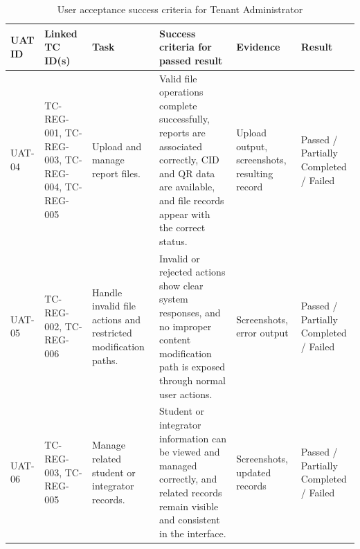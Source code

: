 \begin{table}[H]
  \centering
  \smalltable
  \scriptsize
  {%
  \setlength{\tabcolsep}{3pt}
  \renewcommand{\arraystretch}{1.18}
  \begin{tabular}{|>{\raggedright\arraybackslash}p{}|
                  >{\raggedright\arraybackslash}p{}|
                  >{\raggedright\arraybackslash}p{}|
                  >{\raggedright\arraybackslash}p{}|
                  >{\raggedright\arraybackslash}p{}|
                  >{\centering\arraybackslash}p{}|}
    \hline
    \textbf{UAT ID} &
    \textbf{Linked TC ID(s)} &
    \textbf{Task} &
    \textbf{Success criteria for passed result} &
    \textbf{Evidence} &
    \textbf{Result} \\
    \hline\hline

    UAT-04 &
    TC-REG-001, TC-REG-003, TC-REG-004, TC-REG-005 &
    Upload and manage report files. &
    Valid file operations complete successfully, reports are associated
    correctly, CID and QR data are available, and file records appear with the
    correct status. &
    Upload output, screenshots, resulting record &
    Passed / Partially Completed / Failed \\
    \hline

    UAT-05 &
    TC-REG-002, TC-REG-006 &
    Handle invalid file actions and restricted modification paths. &
    Invalid or rejected actions show clear system responses, and no improper
    content modification path is exposed through normal user actions. &
    Screenshots, error output &
    Passed / Partially Completed / Failed \\
    \hline

    UAT-06 &
    TC-REG-003, TC-REG-005 &
    Manage related student or integrator records. &
    Student or integrator information can be viewed and managed correctly, and
    related records remain visible and consistent in the interface. &
    Screenshots, updated records &
    Passed / Partially Completed / Failed \\
    \hline

  \end{tabular}
  }%
  \captionsetup{type=table}
  \caption{User acceptance success criteria for Tenant Administrator}
  \label{tab:uat-success-tenant}
\end{table}

